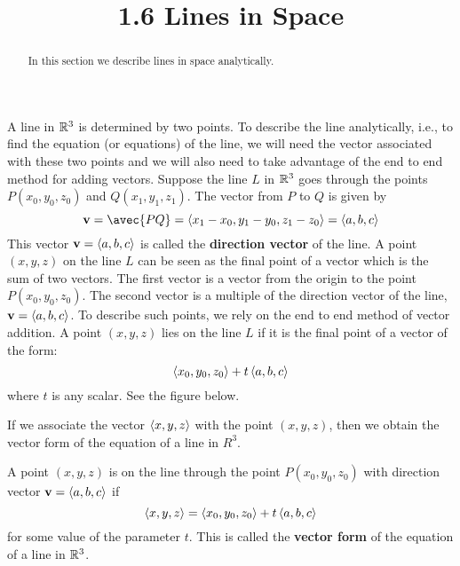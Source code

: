\documentclass[handout]{ximera}
\title{1.6 Lines in Space}
\begin{document}
\begin{abstract}
In this section we describe lines in space analytically.
\end{abstract}
 
\maketitle

A line in $\mathbb R^3$ is determined by two points. To describe the line analytically, i.e., to find the equation (or equations) of the line,
we will need the vector associated with these two points and we will also need to take advantage of the end to end method for adding vectors.
Suppose the line $L$ in $\mathbb R^3$ goes through the points $P(x_0, y_0, z_0)$ and $Q(x_1, y_1, z_1)$. The vector from $P$ to $Q$ is given by
\[
\vec{v} = \avec{PQ} = \vector{x_1-x_0,y_1-y_0,z_1-z_0} = \vector{a,b,c}
\]
This vector $\mathbf v = \left\langle a,b,c\right\rangle$ is called the \textbf{direction vector} of the line. 
A point $(x, y, z)$ on the line $L$ can be seen as the final point of a vector which is the sum of two vectors.
The first vector is a vector from the origin to the point $P(x_0, y_0, z_0)$.
The second vector is a multiple of the direction vector of the line, $\mathbf v = \left\langle a, b, c\right\rangle$.
To describe such points, we rely on the end to end method of vector addition. A point $(x, y, z)$ lies on the line $L$ if
it is the final point of a vector of the form:
\[
\left\langle x_0, y_0, z_0\right\rangle + t\left\langle a, b, c\right\rangle
\]
where $t$ is any scalar. See the figure below.

\begin{image}
\end{image}
 
If we associate the vector $\left\langle x, y, z\right\rangle$ with the point $(x, y, z)$, then we obtain the vector form of the equation of a line in $R^3$.

\begin{definition}
A point $(x, y, z)$ is on the line through the point $P(x_0, y_0, z_0)$ with direction vector $\mathbf v = \left\langle a, b, c\right\rangle$
if
\[
\left\langle x, y, z\right\rangle = \left\langle x_0, y_0, z_0\right\rangle + t\left\langle a, b, c\right\rangle
\]
for some value of the parameter $t$.
This is called the {\bf vector form} of the equation of a line in $\mathbb R^3$.
\end{definition}
\end{document}
